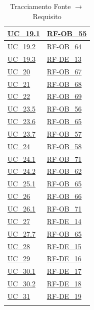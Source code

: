 \begin{longtable}{|>{\raggedright}p{}|>{\raggedright\arraybackslash}p{}|}
    \hline
    \hyperref[uc_19.1]{UC\_19.1} & \hyperlink{rf-ob_55}{RF-OB\_55} \\
    \hline
    \hyperref[uc_19.2]{UC\_19.2} & \hyperlink{rf-ob_64}{RF-OB\_64} \\
    \hline
    \hyperref[uc_19.3]{UC\_19.3} & \hyperlink{rf-de_13}{RF-DE\_13} \\
    \hline
    \hyperref[uc_20]{UC\_20} & \hyperlink{rf-ob_67}{RF-OB\_67} \\
    \hline
    \hyperref[uc_21]{UC\_21} & \hyperlink{rf-ob_68}{RF-OB\_68} \\
    \hline
    \hyperref[uc_22]{UC\_22} & \hyperlink{rf-ob_69}{RF-OB\_69} \\
    \hline
    \hyperref[uc_23.5]{UC\_23.5} & \hyperlink{rf-ob_56}{RF-OB\_56} \\
    \hline
    \hyperref[uc_23.6]{UC\_23.6} & \hyperlink{rf-ob_65}{RF-OB\_65} \\
    \hline
    \hyperref[uc_23.7]{UC\_23.7} & \hyperlink{rf-ob_57}{RF-OB\_57} \\
    \hline
    \hyperref[uc_24]{UC\_24} & \hyperlink{rf-ob_58}{RF-OB\_58} \\
    \hline
    \hyperref[uc_24.1]{UC\_24.1} & \hyperlink{rf-ob_71}{RF-OB\_71} \\
    \hline
    \hyperref[uc_24.2]{UC\_24.2} & \hyperlink{rf-ob_62}{RF-OB\_62} \\
    \hline
    \hyperref[uc_25.1]{UC\_25.1} & \hyperlink{rf-ob_65}{RF-OB\_65} \\
    \hline
    \hyperref[uc_26]{UC\_26} & \hyperlink{rf-ob_66}{RF-OB\_66} \\
    \hline
    \hyperref[uc_26.1]{UC\_26.1} & \hyperlink{rf-ob_71}{RF-OB\_71} \\
    \hline
    \hyperref[uc_27]{UC\_27} & \hyperlink{rf-de_14}{RF-DE\_14} \\
    \hline
    \hyperref[uc_27.7]{UC\_27.7} & \hyperlink{rf-ob_65}{RF-OB\_65} \\
    \hline
    \hyperref[uc_28]{UC\_28} & \hyperlink{rf-de_15}{RF-DE\_15} \\
    \hline
    \hyperref[uc_29]{UC\_29} & \hyperlink{rf-de_16}{RF-DE\_16} \\
    \hline
    \hyperref[uc_30.1]{UC\_30.1} & \hyperlink{rf-de_17}{RF-DE\_17} \\
    \hline
    \hyperref[uc_30.2]{UC\_30.2} & \hyperlink{rf-de_18}{RF-DE\_18} \\
    \hline
    \hyperref[uc_31]{UC\_31} & \hyperlink{rf-de_19}{RF-DE\_19} \\
    \hline
    \caption{Tracciamento Fonte $\rightarrow$ Requisito}
\end{longtable}


